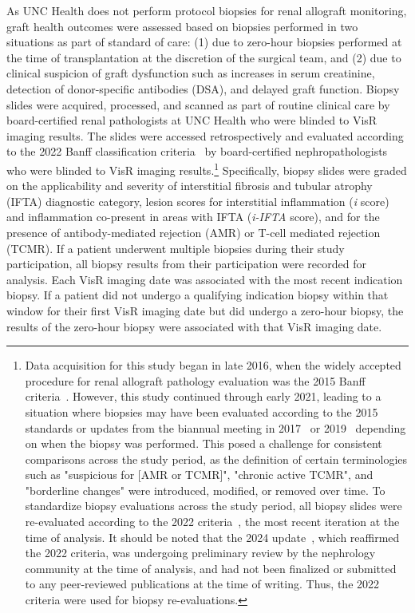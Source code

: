 As UNC Health does not perform protocol biopsies for renal allograft monitoring, graft health outcomes were assessed based on biopsies performed in two situations as part of standard of care: (1) due to zero-hour biopsies performed at the time of transplantation at the discretion of the surgical team, and (2) due to clinical suspicion of graft dysfunction such as increases in serum creatinine, detection of donor-specific antibodies (DSA), and delayed graft function. Biopsy slides were acquired, processed, and scanned as part of routine clinical care by board-certified renal pathologists at UNC Health who were blinded to VisR imaging results. The slides were accessed retrospectively and evaluated according to the 2022 Banff classification criteria~\cite{naesens_Banff_2024} by board-certified nephropathologists who were blinded to VisR imaging results.\footnote{
    Data acquisition for this study began in late 2016, when the widely accepted procedure for renal allograft pathology evaluation was the 2015 Banff criteria~\cite{loupy_Banff_2017}. However, this study continued through early 2021, leading to a situation where biopsies may have been evaluated according to the 2015 standards or updates from the biannual meeting in 2017~\cite{haas_Banff_2018} or 2019~\cite{loupy_Banff_2020} depending on when the biopsy was performed. This posed a challenge for consistent comparisons across the study period, as the definition of certain terminologies such as "suspicious for [AMR or TCMR]", "chronic active TCMR", and "borderline changes" were introduced, modified, or removed over time. To standardize biopsy evaluations across the study period, all biopsy slides were re-evaluated according to the 2022 criteria~\cite{naesens_Banff_2024}, the most recent iteration at the time of analysis. It should be noted that the 2024 update~\cite{naesens_Banff_2025}, which reaffirmed the 2022 criteria, was undergoing preliminary review by the nephrology community at the time of analysis, and had not been finalized or submitted to any peer-reviewed publications at the time of writing. Thus, the 2022 criteria were used for biopsy re-evaluations.
} Specifically, biopsy slides were graded on the applicability and severity of interstitial fibrosis and tubular atrophy (IFTA) diagnostic category, lesion scores for interstitial inflammation (\emph{i} score) and inflammation co-present in areas with IFTA (\emph{i-IFTA} score), and for the presence of antibody-mediated rejection (AMR) or T-cell mediated rejection (TCMR). If a patient underwent multiple biopsies during their study participation, all biopsy results from their participation were recorded for analysis. Each VisR imaging date was associated with the most recent indication biopsy. If a patient did not undergo a qualifying indication biopsy within that window for their first VisR imaging date but did undergo a zero-hour biopsy, the results of the zero-hour biopsy were associated with that VisR imaging date.

